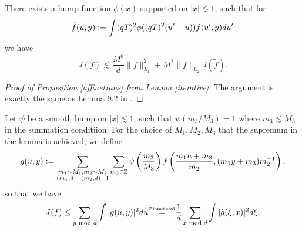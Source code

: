 \begin{lemma} \label{iterative}
    There exists a bump function $\phi(x)$ supported on $|x|\lesssim 1$, such that for \[
    \tilde{f}(u,y) \mathrel{\mathop:}= \int (qT)^2 \phi((qT)^2(u'-u)) f(u',y) du'
    \]
    we have \[
    J(f)\lesssim \frac{M^6}{d}\|f\|_{L_1}^2 + M^2 \|f\|_{L_2} J(\tilde{f}).
    \]
\end{lemma}

\begin{proof}[Proof of Proposition \ref{affinetrans} from Lemma \ref{iterative}]
    The argument is exactly the same as Lemma 9.2 in \cite{GM2024}.
\end{proof}
Let $\psi$ be a smooth bump on $|x|\lesssim 1$, such that $\psi(m_3/M_3)=1$ where $m_3\lesssim M_3$ in the summation conditiion. 
For the choice of $M_1,M_2,M_3$ that the supremum in the lemma is achieved, we define \[
    g(u,y)\mathrel{\mathop:}=\sum_{\substack{m_1\sim M_1,m_2\sim M_2\\ (m_1,d)=(m_2,d)=1}} \sum_{m_3\in \mathbb{Z}} \psi\left(\frac{m_3}{M_3}\right)f\left(\frac{m_1 u+m_3}{m_2} , (m_1 y+m_3)m_2^{-1}\right),
\]so that we have \[
J(f)\leq \sum_{y\mod d} \int |g(u,y)|^2 du \quad \stackeq{Plancheral} \quad  \frac{1}{d}\sum_{x\mod d} \int |\hat{g}(\xi,x)|^2 d\xi.
\]
